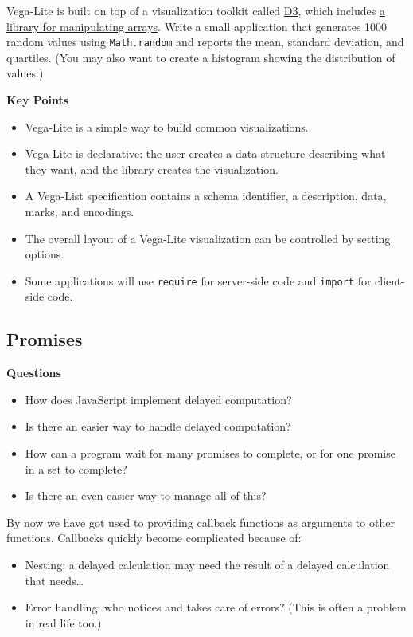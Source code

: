 Vega-Lite is built on top of a visualization toolkit called
\href{https://d3js.org/}{D3}, which includes
\href{https://github.com/d3/d3-array}{a library for manipulating
arrays}. Write a small application that generates 1000 random values
using \texttt{Math.random} and reports the mean, standard deviation, and
quartiles. (You may also want to create a histogram showing the
distribution of values.)

\textbf{Key Points}

\begin{itemize}
\tightlist
\item
  Vega-Lite is a simple way to build common visualizations.
\item
  Vega-Lite is declarative: the user creates a data structure describing
  what they want, and the library creates the visualization.
\item
  A Vega-List specification contains a schema identifier, a description,
  data, marks, and encodings.
\item
  The overall layout of a Vega-Lite visualization can be controlled by
  setting options.
\item
  Some applications will use \texttt{require} for server-side code and
  \texttt{import} for client-side code.
\end{itemize}

\hypertarget{s:promises}{\subsection{Promises}\label{s:promises}}

\textbf{Questions}

\begin{itemize}
\tightlist
\item
  How does JavaScript implement delayed computation?
\item
  Is there an easier way to handle delayed computation?
\item
  How can a program wait for many promises to complete, or for one
  promise in a set to complete?
\item
  Is there an even easier way to manage all of this?
\end{itemize}

By now we have got used to providing callback functions as arguments to
other functions. Callbacks quickly become complicated because of:

\begin{itemize}
\tightlist
\item
  Nesting: a delayed calculation may need the result of a delayed
  calculation that needs\ldots{}
\item
  Error handling: who notices and takes care of errors? (This is often a
  problem in real life too.)
\end{itemize}

